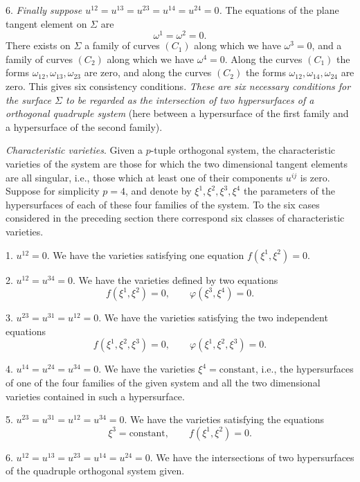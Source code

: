 \documentclass[leqno,11pt]{book}
\numberwithin{equation}{chapter}
\theoremstyle{shape1}
\theoremstyle{shape0}
\theoremstyle{shape2}
\theoremstyle{definition}
\begin{document}
6. \emph{Finally suppose $u^{12}=u^{13}=u^{23}=u^{14}=u^{24}=0$.} The equations of the plane tangent element on $\Sigma$ are
\[
\omega^{1}=\omega^{2}=0.
\]
There exists on $\Sigma$ a family of curves $(C_{1})$ along which we have $\omega^{3}=0$, and a family of curves $(C_{2})$ along which we have $\omega^{4}=0$. Along the curves $(C_{1})$ the forms $\omega_{12},\omega_{13},\omega_{23}$ are zero, and along the curves $(C_{2})$ the forms $\omega_{12},\omega_{14},\omega_{24}$ are zero. This gives six consistency conditions. \emph{These are six necessary conditions for the surface $\Sigma$ to be regarded as the intersection of two hypersurfaces of a orthogonal quadruple system} (here between a hypersurface of the first family and a hypersurface of the second family).


\vspace{12pt}\fsec\emph{Characteristic varieties}. Given a $p$-tuple orthogonal system, the characteristic varieties of the system are those for which the two dimensional tangent elements are all singular, i.e., those which at least one of their components $u^{ij}$ is zero. Suppose for simplicity $p=4$, and denote by $\xi^{1},\xi^{2},\xi^{3},\xi^{4}$ the parameters of the hypersurfaces of each of these four families of the system. To the six cases considered in the preceding section there correspond six classes of characteristic varieties.

1. $u^{12}=0$. We have the varieties satisfying one equation $f(\xi^{1},\xi^{2})=0$.

2. $u^{12}=u^{34}=0$. We have the varieties defined by two equations
\[
f(\xi^{1},\xi^{2})=0,\qquad\varphi(\xi^{3},\xi^{4})=0.
\]

3. $u^{23}=u^{31}=u^{12}=0$. We have the varieties satisfying the two independent equations
\[
f(\xi^{1},\xi^{2},\xi^{3})=0,\qquad\varphi(\xi^{1},\xi^{2},\xi^{3})=0.
\]

4. $u^{14}=u^{24}=u^{34}=0$. We have the varieties $\xi^{4}=\text{constant}$, i.e., the hypersurfaces of one of the four families of the given system and all the two dimensional varieties contained in such a hypersurface.

5. $u^{23}=u^{31}=u^{12}=u^{34}=0$. We have the varieties satisfying the equations
\[
\xi^{3}=\text{constant},\qquad f(\xi^{1},\xi^{2})=0.
\]

6. $u^{12}=u^{13}=u^{23}=u^{14}=u^{24}=0$. We have the intersections of two hypersurfaces of the quadruple orthogonal system given.
\end{document}
